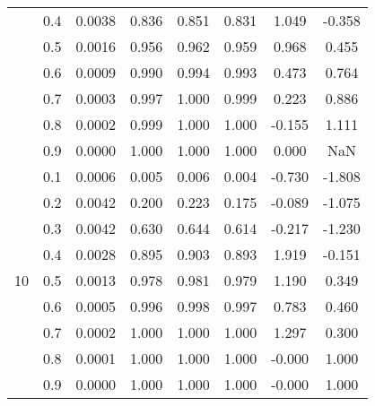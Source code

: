 \documentclass[11pt,a4paper]{report}
\begin{document}
\begin{longtable}{ | c | c || c | c | c | c | c | c | }
 & 0.4 & 0.0038 & 0.836 & 0.851 & 0.831 & 1.049 & -0.358 \\
 & 0.5 & 0.0016 & 0.956 & 0.962 & 0.959 & 0.968 & 0.455 \\
 & 0.6 & 0.0009 & 0.990 & 0.994 & 0.993 & 0.473 & 0.764 \\
 & 0.7 & 0.0003 & 0.997 & 1.000 & 0.999 & 0.223 & 0.886 \\
 & 0.8 & 0.0002 & 0.999 & 1.000 & 1.000 & -0.155 & 1.111 \\
 & 0.9 & 0.0000 & 1.000 & 1.000 & 1.000 & 0.000 & NaN \\
 \hline
\multirow{9}{*}{10} & 0.1 & 0.0006 & 0.005 & 0.006 & 0.004 & -0.730 & -1.808 \\
 & 0.2 & 0.0042 & 0.200 & 0.223 & 0.175 & -0.089 & -1.075 \\
 & 0.3 & 0.0042 & 0.630 & 0.644 & 0.614 & -0.217 & -1.230 \\
 & 0.4 & 0.0028 & 0.895 & 0.903 & 0.893 & 1.919 & -0.151 \\
 & 0.5 & 0.0013 & 0.978 & 0.981 & 0.979 & 1.190 & 0.349 \\
 & 0.6 & 0.0005 & 0.996 & 0.998 & 0.997 & 0.783 & 0.460 \\
 & 0.7 & 0.0002 & 1.000 & 1.000 & 1.000 & 1.297 & 0.300 \\
 & 0.8 & 0.0001 & 1.000 & 1.000 & 1.000 & -0.000 & 1.000 \\
 & 0.9 & 0.0000 & 1.000 & 1.000 & 1.000 & -0.000 & 1.000 \\
 \hline
\hline
\end{longtable}
\end{document}
